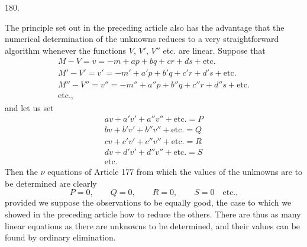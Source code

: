\begin{center}\hypertarget{native-252-article180}{}180.\end{center}
The principle set out in the preceding article also has the advantage that the numerical determination of the unknowns reduces to a very straightforward algorithm whenever the functions $V$, $V'$, $V''$ etc. are linear. Suppose that
\[
\begin{gathered}
M-V=v=-m+ap+bq+cr+ds+\text{etc.}\\
M'-V'=v'=-m'+a'p+b'q+c'r+d's+\text{etc.}\\
M''-V''=v''=-m''+a''p+b''q+c''r+d''s+\text{etc.}\\
\text{etc.,}
\end{gathered}
\]
and let us set
\[
\begin{gathered}
av+a'v'+a''v''+\text{etc.}=P\\
bv+b'v'+b''v''+\text{etc.}=Q\\
cv+c'v'+c''v''+\text{etc.}=R\\
dv+d'v'+d''v''+\text{etc.}=S\\
\text{etc.}
\end{gathered}
\]
Then the $\nu$ equations of Article 177 from which the values of the unknowns are to be determined are clearly
\[
P=0,\qquad Q=0,\qquad R=0,\qquad S=0\quad\text{etc.,}
\]
provided we suppose the observations to be equally good, the case to which we showed in the preceding article how to reduce the others. There are thus as many linear equations as there are unknowns to be determined, and their values can be found by ordinary elimination.

